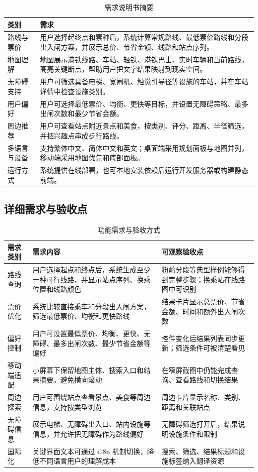 \documentclass[UTF8,a4paper,11pt]{ctexart}
\begin{document}
\begin{table}[H]
  \centering
  \caption{需求说明书摘要}
  \label{tab:req}
  \begin{tabularx}{\textwidth}{lY}
    \toprule
    类别 & 需求 \\
    \midrule
    路线与票价 & 用户选择起终点和票种后，系统计算常规路线、最低票价路线和分段出入闸方案，并展示总价、节省金额、线路和站点序列。 \\
    地图理解 & 地图展示港铁线路、车站、轻铁、港铁巴士、实时车辆和当前路线，高亮关键断点，帮助用户把文字结果映射到现实空间。 \\
    无障碍支持 & 用户可筛选具备电梯、宽闸机、触觉引导径等设施的车站，并在车站详情中检查设施类别。 \\
    用户偏好 & 用户可选择最低票价、均衡、更快等目标，并设置无障碍策略、最多出闸次数和最少节省金额。 \\
    周边推荐 & 用户可查看站点附近景点和美食，按类别、评分、距离、半径筛选，并把兴趣点串成步行路线。 \\
    多语言与设备 & 支持繁体中文、简体中文和英文；桌面端采用规划面板与地图并列，移动端采用地图优先和底部面板。 \\
    运行方式 & 系统提供在线部署，也可本地安装依赖后运行开发服务器或构建静态前端。 \\
    \bottomrule
  \end{tabularx}
\end{table}

\subsection{详细需求与验收点}

\begin{table}[H]
  \centering
  \caption{功能需求与验收方式}
  \begin{tabularx}{\textwidth}{p{}YY}
    \toprule
    需求类别 & 需求内容 & 可观察验收点 \\
    \midrule
    路线查询 & 用户选择起点和终点后，系统生成至少一种可行线路，并显示站点序列、换乘位置和线路颜色 & 粉岭分段等典型样例能够得到完整步骤；换乘站在线路图中可识别 \\
    票价优化 & 系统比较直接乘车和分段出入闸方案，筛选最低票价、均衡和更快路线 & 结果卡片显示总票价、节省金额、时间和额外出入闸次数 \\
    偏好控制 & 用户可设置最低票价、均衡、更快、无障碍、最多出闸次数、最少节省金额等偏好 & 控件变化后结果列表同步更新；筛选条件可被清楚看见 \\
    移动端适配 & 小屏幕下保留地图主体、搜索入口和结果摘要，避免横向滚动 & 在窄屏截图中仍能完成查询、查看路线和切换结果 \\
    周边探索 & 用户可围绕站点查看景点、美食等周边信息，支持按类型浏览 & 周边卡片显示名称、类别、距离和关联站点 \\
    无障碍信息 & 展示电梯、无障碍出入口、站内设施等信息，并允许把无障碍作为路线偏好 & 无障碍筛选打开后，结果说明设施条件和限制 \\
    国际化 & 关键界面文本可通过 i18n 机制切换，降低不同语言用户的理解成本 & 搜索、筛选、结果标题和设施标签纳入翻译资源 \\
    \bottomrule
  \end{tabularx}
\end{table}
\end{document}
